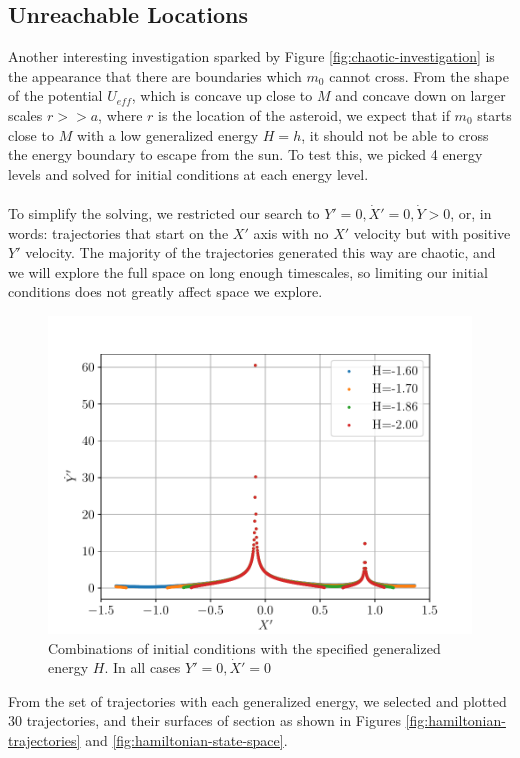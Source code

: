 \documentclass[11pt]{article}
\begin{document}
\subsection{Unreachable Locations}
Another interesting investigation sparked by Figure \ref{fig:chaotic-investigation} is the appearance that there are boundaries which $m_0$ cannot cross. From the shape of the potential $U_{eff}$, which is concave up close to $M$ and concave down on larger scales $r >> a$, where $r$ is the location of the asteroid, we expect that if $m_0$ starts close to $M$ with a low generalized energy $H=h$, it should not be able to cross the energy boundary to escape from the sun. To test this, we picked 4 energy levels and solved for initial conditions at each energy level.
\\
\\
\noindent
To simplify the solving, we restricted our search to $Y'=0, \dot X'=0, \dot Y > 0$, or, in words: trajectories that start on the $X'$ axis with no $X'$ velocity but with positive $Y'$ velocity. The majority of the trajectories generated this way are chaotic, and we will explore the full space on long enough timescales, so limiting our initial conditions does not greatly affect space we explore.  
\begin{figure}[H]
    \centering
    \includegraphics[width=0.7\linewidth]{figures/hamiltonian_values.pdf}
    \caption{Combinations of initial conditions with the specified generalized energy $H$. In all cases $Y'=0, \dot X'=0$}
    \label{fig:hamiltonian-values}
\end{figure}
\noindent
From the set of trajectories with each generalized energy, we selected and plotted 30 trajectories, and their surfaces of section as shown in Figures \ref{fig:hamiltonian-trajectories} and \ref{fig:hamiltonian-state-space}.
\end{document}
